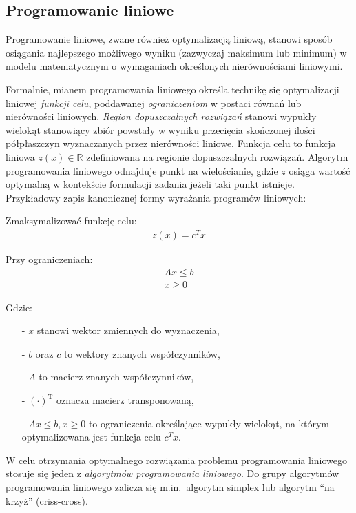 \subsection{Programowanie liniowe}\label{ss_lp}
\par{
  Programowanie liniowe, zwane również optymalizacją liniową, stanowi sposób
  osiągania najlepszego możliwego wyniku (zazwyczaj maksimum lub minimum) w modelu 
  matematycznym o wymaganiach określonych nierównościami liniowymi.
}
\par{
  Formalnie, mianem programowania liniowego określa technikę się optymalizacji 
  liniowej \emph{funkcji celu}, poddawanej \emph{ograniczeniom} w postaci równań 
  lub nierówności liniowych.
  \emph{Region dopuszczalnych rozwiązań} stanowi wypukły wielokąt stanowiący 
  zbiór powstały w wyniku przecięcia skończonej ilości półpłaszczyn wyznaczanych 
  przez nierówności liniowe.
  Funkcja celu to funkcja liniowa $z(x) \in \mathbb{R}$ zdefiniowana na regionie
  dopuszczalnych rozwiązań.
  Algorytm programowania liniowego odnajduje punkt na wielościanie,
  gdzie $z$ osiąga wartość optymalną w kontekście formulacji zadania jeżeli taki
  punkt istnieje. 
  Przykładowy zapis kanonicznej formy wyrażania programów liniowych:\\\par
  Zmaksymalizować funkcję celu:
  \begin{align*}
    z(x)={c^T}x
  \end{align*}\par
  Przy ograniczeniach: \begin{align*}
    Ax \leq b\\
    x\geq 0
  \end{align*}

  Gdzie:
  \begin{itemize}
    \item[-] $x$ stanowi wektor zmiennych do wyznaczenia,
    \item[-] $b$ oraz $c$ to wektory znanych współczynników,
    \item[-] $A$ to macierz znanych współczynników,
    \item[-] ${(\cdot)}^\mathrm{T}$ oznacza macierz transponowaną,
    \item[-] $Ax \leq b, x\geq 0$ to ograniczenia określające wypukły wielokąt,
      na którym optymalizowana jest funkcja celu $c^{T}x$.
  \end{itemize}
}
\par{
  W celu otrzymania optymalnego rozwiązania problemu programowania liniowego
  stosuje się jeden z  \emph{algorytmów programowania liniowego}.
  Do grupy algorytmów programowania liniowego zalicza się m.in.\ algorytm
  simplex lub algorytm ``na krzyż'' (criss-cross).
}
